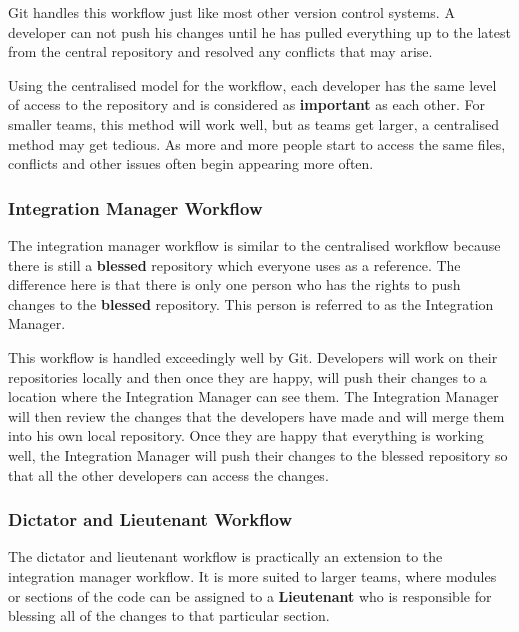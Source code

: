 Git handles this workflow just like most other version control systems.
A developer can not push his changes until he has pulled everything up to the latest from the central repository and resolved any conflicts that may arise.

Using the centralised model for the workflow, each developer has the same level of access to the repository and is considered as \textbf{important} as each other.
For smaller teams, this method will work well, but as teams get larger, a centralised method may get tedious.
As more and more people start to access the same files, conflicts and other issues often begin appearing more often.


\subsubsection{Integration Manager Workflow}
The integration manager workflow is similar to the centralised workflow because there is still a \textbf{blessed} repository which everyone uses as a reference.
The difference here is that there is only one person who has the rights to push changes to the \textbf{blessed} repository.
This person is referred to as the Integration Manager.

This workflow is handled exceedingly well by Git.
Developers will work on their repositories locally and then once they are happy, will push their changes to a location where the Integration Manager can see them.
The Integration Manager will then review the changes that the developers have made and will merge them into his own local repository.
Once they are happy that everything is working well, the Integration Manager will push their changes to the blessed repository so that all the other developers can access the changes.


\subsubsection{Dictator and Lieutenant Workflow}

The dictator and lieutenant workflow is practically an extension to the integration manager workflow.
It is more suited to larger teams, where modules or sections of the code can be assigned to a \textbf{Lieutenant} who is responsible for blessing all of the changes to that particular section.

